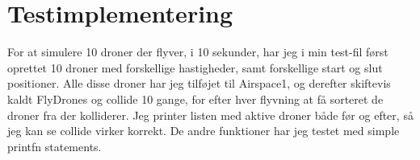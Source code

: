 \documentclass[a4paper]{article}
\begin{document}
\section*{Testimplementering}
For at simulere 10 droner der flyver, i 10 sekunder, har jeg i min test-fil først oprettet 10 droner med forskellige hastigheder, samt forskellige start og slut positioner. Alle disse droner har jeg tilføjet til Airspace1, og derefter skiftevis kaldt FlyDrones og collide 10 gange, for efter hver flyvning at få sorteret de droner fra der kolliderer. Jeg printer listen med aktive droner både før og efter, så jeg kan se collide virker korrekt. De andre funktioner har jeg testet med simple printfn statements. 
\end{document}
